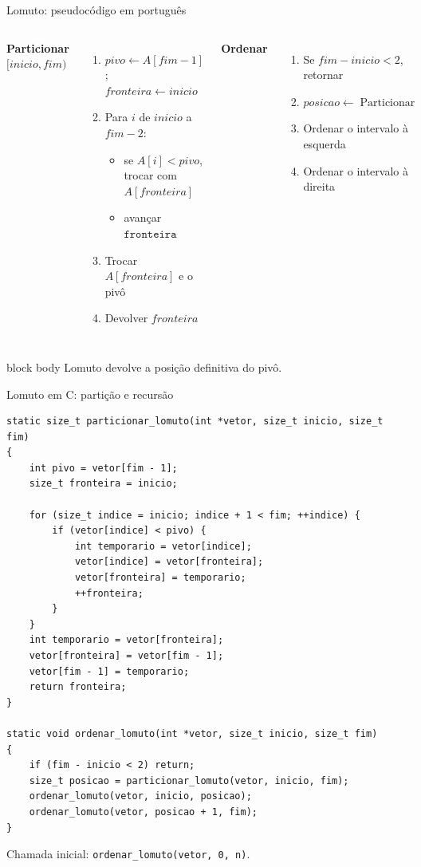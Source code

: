 \documentclass[aspectratio=169,11pt]{beamer}
\newcommand{\citep}[1]{{\color{MidGray}\tiny\cite{#1}}}
\begin{document}
\begin{frame}{Lomuto: pseudocódigo em português}
  \small
  \begin{columns}[T,onlytextwidth]
      \textbf{Particionar \([inicio,fim)\)}
      \begin{enumerate}
        \item \(pivo\gets A[fim-1]\); \(fronteira\gets inicio\)
        \item Para \(i\) de \(inicio\) a \(fim-2\):
        \begin{itemize}
          \item se \(A[i]<pivo\), trocar com \(A[fronteira]\)
          \item avançar \(\texttt{fronteira}\)
        \end{itemize}
        \item Trocar \(A[fronteira]\) e o pivô
        \item Devolver \(fronteira\)
      \end{enumerate}
      \textbf{Ordenar}
      \begin{enumerate}
        \item Se \(fim-inicio<2\), retornar
        \item \(posicao\gets\operatorname{Particionar}\)
        \item Ordenar o intervalo à esquerda
        \item Ordenar o intervalo à direita
      \end{enumerate}
  \end{columns}
  \vspace{.35em}
  \begin{beamercolorbox}[wd=\linewidth,sep=.55em]{block body}
    \centering
    \scriptsize Lomuto devolve a posição definitiva do pivô.
  \end{beamercolorbox}
  \citep{cormen2022}
\end{frame}

\begin{frame}[fragile]{Lomuto em C: partição e recursão}
  \begin{lstlisting}[style=code,basicstyle=\ttfamily\tiny]
static size_t particionar_lomuto(int *vetor, size_t inicio, size_t fim)
{
    int pivo = vetor[fim - 1];
    size_t fronteira = inicio;

    for (size_t indice = inicio; indice + 1 < fim; ++indice) {
        if (vetor[indice] < pivo) {
            int temporario = vetor[indice];
            vetor[indice] = vetor[fronteira];
            vetor[fronteira] = temporario;
            ++fronteira;
        }
    }
    int temporario = vetor[fronteira];
    vetor[fronteira] = vetor[fim - 1];
    vetor[fim - 1] = temporario;
    return fronteira;
}

static void ordenar_lomuto(int *vetor, size_t inicio, size_t fim)
{
    if (fim - inicio < 2) return;
    size_t posicao = particionar_lomuto(vetor, inicio, fim);
    ordenar_lomuto(vetor, inicio, posicao);
    ordenar_lomuto(vetor, posicao + 1, fim);
}
  \end{lstlisting}
  \scriptsize Chamada inicial: \texttt{ordenar\_lomuto(vetor, 0, n)}.
\end{frame}
\end{document}
